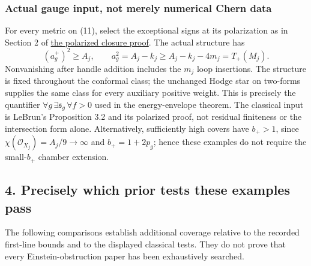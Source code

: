 \documentclass[
  11pt,
]{article}
\begin{document}
\hypertarget{actual-gauge-input-not-merely-numerical-chern-data}{%
\subsubsection{Actual gauge input, not merely numerical Chern
data}\label{actual-gauge-input-not-merely-numerical-chern-data}}

For every metric on (11), select the exceptional signs at its
polarization as in Section 2 of \href{lebrun_stability_closure.md}{the
polarized closure proof}. The actual structure has \[
 (a_g^+)^2\ge A_j,\qquad a_g^2=A_j-k_j\ge A_j-k_j-4m_j=T_+(M_j).
\] Nonvanishing after handle addition includes the \(m_j\) loop
insertions. The structure is fixed throughout the conformal class; the
unchanged Hodge star on two-forms supplies the same class for every
auxiliary positive weight. This is precisely the quantifier
\(\forall g\,\exists\mathfrak s_g\,\forall f>0\) used in the
energy-envelope theorem. The classical input is LeBrun's Proposition 3.2
and its polarized proof, not residual finiteness or the intersection
form alone. Alternatively, sufficiently high covers have \(b_+>1\),
since \(\chi(\mathcal O_{X_j})=A_j/9\to\infty\) and \(b_+=1+2p_g\);
hence these examples do not require the small-\(b_+\) chamber extension.

\hypertarget{precisely-which-prior-tests-these-examples-pass}{%
\subsection{4. Precisely which prior tests these examples
pass}\label{precisely-which-prior-tests-these-examples-pass}}

The following comparisons establish additional coverage relative to the
recorded first-line bounds and to the displayed classical tests. They do
not prove that every Einstein-obstruction paper has been exhaustively
searched.
\end{document}
